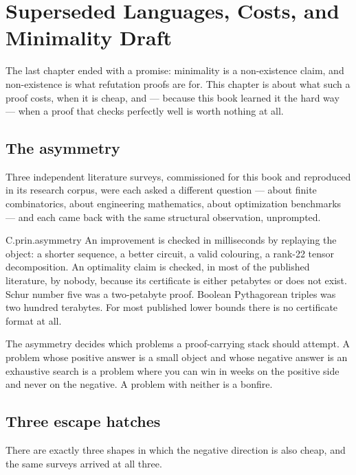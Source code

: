 \chapter{Superseded Languages, Costs, and Minimality Draft}
\label{ch:certificates}

The last chapter ended with a promise: minimality is a non-existence claim, and non-existence is what refutation proofs are for. This chapter is about what such a proof costs, when it is cheap, and --- because this book learned it the hard way --- when a proof that checks perfectly well is worth nothing at all.

\section{The asymmetry}
\label{sec:asymmetry}

Three independent literature surveys, commissioned for this book and reproduced in its research corpus, were each asked a different question --- about finite combinatorics, about engineering mathematics, about optimization benchmarks --- and each came back with the same structural observation, unprompted.

\begin{artifact}{C.prin.asymmetry}
An improvement is checked in milliseconds by replaying the object: a shorter sequence, a better circuit, a valid colouring, a rank-22 tensor decomposition. An optimality claim is checked, in most of the published literature, by nobody, because its certificate is either petabytes or does not exist. Schur number five was a two-petabyte proof. Boolean Pythagorean triples was two hundred terabytes. For most published lower bounds there is no certificate format at all.
\end{artifact}

The asymmetry decides which problems a proof-carrying stack should attempt. A problem whose positive answer is a small object and whose negative answer is an exhaustive search is a problem where you can win in weeks on the positive side and never on the negative. A problem with neither is a bonfire.

\section{Three escape hatches}
\label{sec:hatches}

There are exactly three shapes in which the negative direction is also cheap, and the same surveys arrived at all three.

